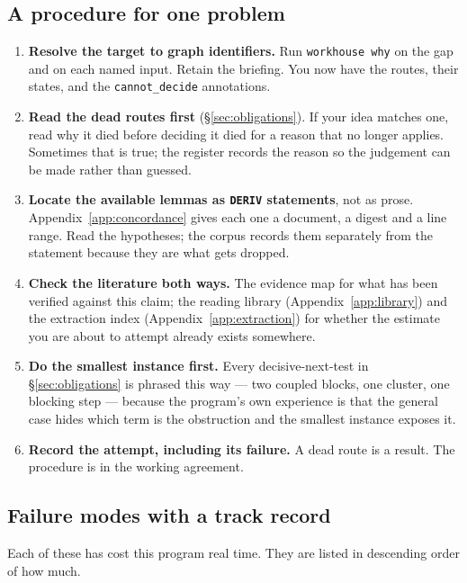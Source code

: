 \subsection{A procedure for one problem}

\begin{enumerate}
  \item \textbf{Resolve the target to graph identifiers.} Run
    \texttt{workhouse why} on the gap and on each named input. Retain
    the briefing. You now have the routes, their states, and the
    \texttt{cannot\_decide} annotations.
  \item \textbf{Read the dead routes first} (\S\ref{sec:obligations}).
    If your idea matches one, read why it died before deciding it
    died for a reason that no longer applies. Sometimes that is true;
    the register records the reason so the judgement can be made
    rather than guessed.
  \item \textbf{Locate the available lemmas as \texttt{DERIV}
    statements}, not as prose. Appendix~\ref{app:concordance} gives
    each one a document, a digest and a line range. Read the
    hypotheses; the corpus records them separately from the statement
    because they are what gets dropped.
  \item \textbf{Check the literature both ways.} The evidence map for
    what has been verified against this claim; the reading library
    (Appendix~\ref{app:library}) and the extraction index
    (Appendix~\ref{app:extraction}) for whether the estimate you are
    about to attempt already exists somewhere.
  \item \textbf{Do the smallest instance first.} Every decisive-next-test
    in \S\ref{sec:obligations} is phrased this way --- two coupled
    blocks, one cluster, one blocking step --- because the program's
    own experience is that the general case hides which term is the
    obstruction and the smallest instance exposes it.
  \item \textbf{Record the attempt, including its failure.} A dead
    route is a result. The procedure is in the working agreement.
\end{enumerate}

\subsection{Failure modes with a track record}

Each of these has cost this program real time. They are listed in
descending order of how much.


